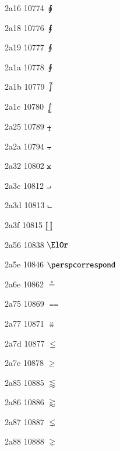 \documentclass[11pt]{article}
\begin{document}

2a16 10774 \ensuremath{\sqrint}

2a18 10776 \ensuremath{\intx}

2a19 10777 \ensuremath{\intcap}

2a1a 10778 \ensuremath{\intcup}

2a1b 10779 \ensuremath{\upint}

2a1c 10780 \ensuremath{\lowint}

2a25 10789 \ensuremath{\plusdot}

2a2a 10794 \ensuremath{\minusdot}




2a32 10802 \ensuremath{\btimes}



2a3c 10812 \ensuremath{\intprod}

2a3d 10813 \ensuremath{\intprodr}

2a3f 10815 \ensuremath{\amalg}




2a56 10838 \ensuremath{\ElOr}

2a5e 10846 \ensuremath{\perspcorrespond}



2a6e 10862 \ensuremath{\stackrel{*}{=}}

2a75 10869 \ensuremath{\Equal}

2a77 10871 \ensuremath{\ddotseq}

2a7d 10877 \ensuremath{\leqslant}

2a7e 10878 \ensuremath{\geqslant}

2a85 10885 \ensuremath{\lessapprox}

2a86 10886 \ensuremath{\gtrapprox}

2a87 10887 \ensuremath{\lneq}

2a88 10888 \ensuremath{\gneq}
\end{document}
